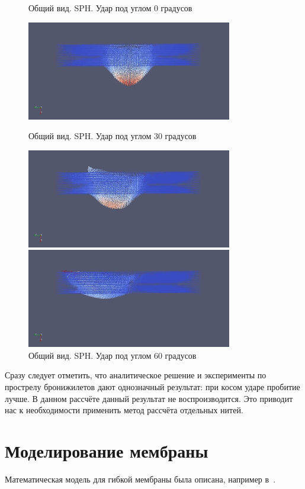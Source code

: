 \begin{figure}[H]
    \centering

    \caption{Общий вид. SPH. Удар под углом 0 градусов}
    \includegraphics[width=0.8\textwidth]{img/sph_0.png}

    \caption{Общий вид. SPH. Удар под углом 30 градусов}
    \includegraphics[width=0.8\textwidth]{img/sph_30.png}

    \caption{Общий вид. SPH. Удар под углом 60 градусов}
    \includegraphics[width=0.8\textwidth]{img/sph_60.png}
\end{figure}

Сразу следует отметить, что аналитическое решение и эксперименты по прострелу бронижилетов дают однозначный результат:
при косом ударе пробитие лучше.
В данном рассчёте данный результат не воспроизводится.
Это приводит нас к необходимости применить метод рассчёта отдельных нитей.

\section{Моделирование мембраны}\label{sec:model-membrane}
Математическая модель для гибкой мембраны была описана, например в~\cite{rakhmatulin}.

